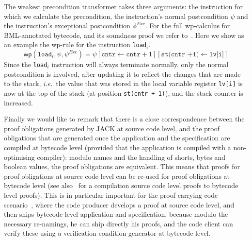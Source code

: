 The weakest precondition transformer takes three arguments: the
instruction for which we calculate the precondition, the instruction's
normal postcondition $\psi$ and the instruction's exceptional
postcondition $\phi^{\mathit{Exc}}$. For the full wp-calculus for
BML-annotated bytecode, and its soundness proof we refer
to~\cite{Pavlova:phd}. Here we show as an example the wp-rule for the
instruction \texttt{load\(_i\)}.
\[
\mathsf{wp}(\texttt{load}_i, \psi, \psi^{\mathit{Exc}})  = 
\psi[\texttt{cntr} \leftarrow \texttt{cntr} + 1][\texttt{st(cntr +1)}
\leftarrow \texttt{lv[i]}]
\]
Since the \texttt{load}\(_i\) instruction will always terminate
normally, only the normal postcondition is involved, after updating it
to reflect the changes that are made to the stack, \emph{i.e.}\ the
value that was stored in the local variable register \texttt{lv[i]} is
now at the top of the stack (at position \texttt{st(cntr + 1)}),  and 
the stack counter is increased.



Finally we would like to remark that there is a close correspondence
between the proof obligations generated by JACK at source code level,
and the proof obligations that are generated once the application and
the specification are compiled at bytecode level (provided that the
application is compiled with a non-optimising compiler): modulo names
and the handling of shorts, bytes and boolean values, the proof
obligations are equivalent. This means that proofs for proof
obligations at source code level can be re-used for proof obligations
at bytecode level (see also~\cite{gta05:fast} for a compilation source
code level proofs to bytecode level proofs). This is in particular
important for the proof carrying code scenario~\cite{Necula97}, where
the code producer develops a proof at source code level, and then
ships bytecode level application and specification, because modulo the
necessary re-namings, he can ship directly his proofs, and the code
client can verify these using a verification condition generator at
bytecode level.


